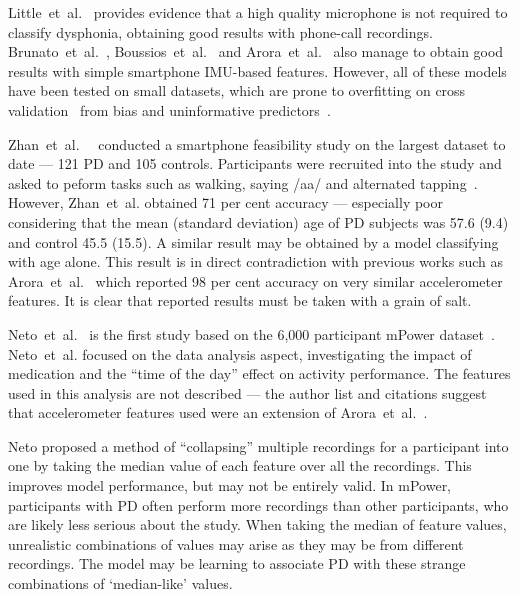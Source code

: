 \documentclass[12pt, twoside]{book}
\begin{document}
Little~et~al.~\cite{splittledysphonia2009} provides evidence that a high quality microphone is not required to classify dysphonia, obtaining good results with phone-call recordings. Brunato~et~al.~\cite{smartphonemjfoxlion}, Boussios~et~al.~\cite{smartphonemjfoxB} and Arora~et~al.~\cite{arora2014high} also manage to obtain good results with simple smartphone IMU-based features. However, all of these models have been tested on small datasets, which are prone to overfitting on cross validation~\cite{overfittingcv} from bias and uninformative predictors~\cite{freedmanparadox}. 


Zhan~et~al.~~\cite{zhan2016high} conducted a smartphone feasibility study on the largest dataset to date --- 121 PD and 105 controls. Participants were recruited into the study and asked to peform tasks such as walking, saying /aa/ and alternated tapping~\cite{tapping}. However, Zhan~et~al. obtained 71 per cent accuracy --- especially poor considering that the mean (standard deviation) age of PD subjects was 57.6 (9.4) and control 45.5 (15.5). A similar result may be obtained by a model classifying with age alone. This result is in direct contradiction with previous works such as Arora~et~al.~\cite{arora2014high} which reported 98 per cent accuracy on very similar accelerometer features. It is clear that reported results must be taken with a grain of salt. %


Neto~et~al.~\cite{mpowerneto2017analysis} is the first study based on the 6,000 participant mPower dataset~\cite{mpower}. Neto~et~al. focused on the data analysis aspect, investigating the impact of medication and the ``time of the day'' effect on activity performance. The features used in this analysis are not described --- the author list and citations suggest that accelerometer features used were an extension of Arora~et~al.~\cite{arora2014high}. 

Neto proposed a method of ``collapsing'' multiple recordings for a participant into one by taking the median value of each feature over all the recordings. This improves model performance, but may not be entirely valid. In mPower, participants with PD often perform more recordings than other participants, who are likely less serious about the study. When taking the median of feature values, unrealistic combinations of values may arise as they may be from different recordings. The model may be learning to associate PD with these strange combinations of `median-like' values.
\end{document}

